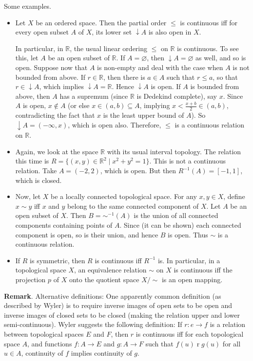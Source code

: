 \documentclass[12pt]{article}
\newcommand{\down}{\downarrow\!\!}
\begin{document}
Some examples.
\begin{itemize}
\item Let $X$ be an ordered space.  Then the partial order $\le$ is continuous iff for every open subset $A$ of $X$, its lower set $\down A$ is also open in $X$.

In particular, in $\mathbb{R}$, the usual linear ordering $\le$ on $\mathbb{R}$ is continuous.  To see this, let $A$ be an open subset of $\mathbb{R}$.  If $A=\varnothing$, then $\down A=\varnothing$ as well, and so is open.  Suppose now that $A$ is non-empty and deal with the case when $A$ is not bounded from above.  If $r\in \mathbb{R}$, then there is $a\in A$ such that $r\le a$, so that $r\in \down A$, which implies $\down A=\mathbb{R}$.  Hence $\down A$ is open.  If $A$ is bounded from above, then $A$ has a supremum (since $\mathbb{R}$ is Dedekind complete), say $x$.  Since $A$ is open, $x\notin A$ (or else $x\in (a,b)\subseteq A$, implying $x<\frac{x+b}{2}\in (a,b)$, contradicting the fact that $x$ is the least upper bound of $A$).  So $\down A=(-\infty,x)$, which is open also.  Therefore, $\le$ is a continuous relation on $\mathbb{R}$.
\item Again, we look at the space $\mathbb{R}$ with its usual interval topology.  The relation this time is $R=\lbrace (x,y)\in \mathbb{R}^2 \mid x^2+y^2=1\rbrace$.  This is not a continuous relation.  Take $A=(-2,2)$, which is open.  But then $R^{-1}(A)=[-1,1]$, which is closed.
\item Now, let $X$ be a locally connected topological space.  For any $x,y\in X$, define $x\sim y$ iff $x$ and $y$ belong to the same connected component of $X$.  Let $A$ be an open subset of $X$.  Then $B=\sim^{-1}(A)$ is the union of all connected components containing points of $A$.  Since (it can be shown) each connected component is open, so is their union, and hence $B$ is open. Thus $\sim$ is a continuous relation.
\item If $R$ is symmetric, then $R$ is continuous iff $R^{-1}$ is.  In particular, in a topological space $X$, an equivalence relation $\sim$ on $X$ is continuous iff the projection $p$ of $X$ onto the quotient space $X/\sim$ is an open mapping.
\end{itemize}

\textbf{Remark}.  Alternative definitions:
One apparently common definition (as described by Wyler) is to require inverse images of open sets to be open and inverse
images of closed sets to be closed (making the relation upper and lower semi-continuous).  Wyler suggests the following
definition:
If $r\colon e\to f$ is a relation between topological spaces $E$ and $F$, then $r$ is continuous iff for each topological space $A$, and functions $f\colon A\to E$ and $g\colon A\to F$ such that $f(u) \mathrel{r} g(u)$ for all $u\in A$, continuity of $f$ implies continuity of $g$.
\end{document}
